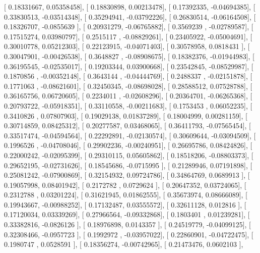 \documentclass{article}
\begin{document}
       [ 0.18331667,  0.05358458],
       [ 0.18830898,  0.00213478],
       [ 0.17392335, -0.04694385],
       [ 0.33830513, -0.03514348],
       [ 0.35294941, -0.03792226],
       [ 0.26830514, -0.06164508],
       [ 0.18326707, -0.0855639 ],
       [ 0.20931279, -0.06765882],
       [ 0.3569239 , -0.02789587],
       [ 0.17515274,  0.03980797],
       [ 0.2515117 , -0.08829261],
       [ 0.23405922, -0.05004691],
       [ 0.30010778,  0.05212303],
       [ 0.22123915, -0.04071403],
       [ 0.30578958,  0.0818431 ],
       [ 0.30047901, -0.00426538],
       [ 0.3648827 , -0.08908675],
       [ 0.18382376, -0.01944983],
       [ 0.36195545, -0.02535017],
       [ 0.19203344,  0.03900668],
       [ 0.23542845, -0.08529987],
       [ 0.1870856 , -0.00352148],
       [ 0.3643144 , -0.04444769],
       [ 0.2488337 , -0.02151878],
       [ 0.1771063 , -0.08621601],
       [ 0.32450345, -0.08698028],
       [ 0.28588512,  0.07528788],
       [ 0.36165756,  0.06720605],
       [ 0.2234011 , -0.02608296],
       [ 0.20364701, -0.06265368],
       [ 0.20793722, -0.05918351],
       [ 0.33110558, -0.00211683],
       [ 0.1753453 ,  0.06052235],
       [ 0.3410826 ,  0.07807903],
       [ 0.19029138,  0.01837289],
       [ 0.18004999,  0.00281159],
       [ 0.30714859,  0.08425312],
       [ 0.20277587,  0.03468065],
       [ 0.36411793, -0.07565454],
       [ 0.33517474, -0.04594564],
       [ 0.22292891, -0.02130574],
       [ 0.30609644, -0.03094509],
       [ 0.1996526 , -0.04708046],
       [ 0.29902236, -0.00240951],
       [ 0.26695786,  0.08424826],
       [ 0.22000242, -0.02095399],
       [ 0.29310115,  0.05605862],
       [ 0.18518206, -0.08803373],
       [ 0.29652195, -0.02731626],
       [ 0.18545686, -0.0715995 ],
       [ 0.21289946,  0.07191898],
       [ 0.25081242, -0.07900869],
       [ 0.32154932,  0.09724786],
       [ 0.34864769,  0.0689913 ],
       [ 0.19057998,  0.08401942],
       [ 0.2172782 ,  0.0729624 ],
       [ 0.20647352,  0.03724065],
       [ 0.2312788 ,  0.03201224],
       [ 0.31621945,  0.01862555],
       [ 0.35673974,  0.08666089],
       [ 0.19943667, -0.00988252],
       [ 0.17132487,  0.03555572],
       [ 0.32611128,  0.012816  ],
       [ 0.17120034,  0.03339269],
       [ 0.27966564, -0.09332868],
       [ 0.1803401 ,  0.01239281],
       [ 0.33382816, -0.0826126 ],
       [ 0.18976898,  0.0143357 ],
       [ 0.24519779, -0.04099125],
       [ 0.32308466, -0.0957723 ],
       [ 0.1992972 , -0.03957022],
       [ 0.22860901, -0.04722475],
       [ 0.1980747 ,  0.0528591 ],
       [ 0.18356274, -0.00742965],
       [ 0.21473476,  0.0602103 ],
\end{document}
